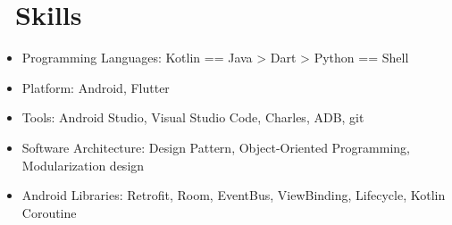 \documentclass{resume}
\begin{document}
    \section{\faCogs\ Skills}
    \begin{itemize}[parsep=0.5ex]
        \item Programming Languages: Kotlin == Java > Dart > Python == Shell
        \item Platform: Android, Flutter
        \item Tools: Android Studio, Visual Studio Code, Charles, ADB, git
        \item Software Architecture: Design Pattern, Object-Oriented Programming, Modularization design
        \item Android Libraries: Retrofit, Room, EventBus, ViewBinding, Lifecycle, Kotlin Coroutine
    \end{itemize}



%
%
\end{document}
